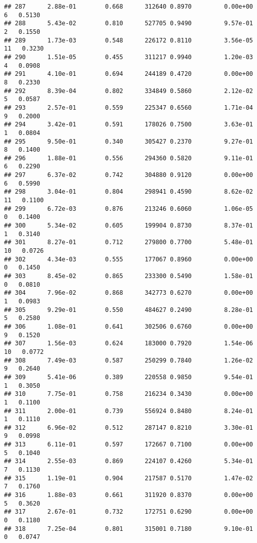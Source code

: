 \documentclass[
]{article}
\begin{document}
\begin{verbatim}
## 287      2.88e-01        0.668      312640 0.8970         0.00e+00   6   0.5130
## 288      5.43e-02        0.810      527705 0.9490         9.57e-01   2   0.1550
## 289      1.73e-03        0.548      226172 0.8110         3.56e-05  11   0.3230
## 290      1.51e-05        0.455      311217 0.9940         1.20e-03   4   0.0908
## 291      4.10e-01        0.694      244189 0.4720         0.00e+00   8   0.2330
## 292      8.39e-04        0.802      334849 0.5860         2.12e-02   5   0.0587
## 293      2.57e-01        0.559      225347 0.6560         1.71e-04   9   0.2000
## 294      3.42e-01        0.591      178026 0.7500         3.63e-01   1   0.0804
## 295      9.50e-01        0.340      305427 0.2370         9.27e-01   8   0.1400
## 296      1.88e-01        0.556      294360 0.5820         9.11e-01   6   0.2290
## 297      6.37e-02        0.742      304880 0.9120         0.00e+00   6   0.5990
## 298      3.04e-01        0.804      298941 0.4590         8.62e-02  11   0.1100
## 299      6.72e-03        0.876      213246 0.6060         1.06e-05   0   0.1400
## 300      5.34e-02        0.605      199904 0.8730         8.37e-01   1   0.3140
## 301      8.27e-01        0.712      279800 0.7700         5.48e-01  10   0.0726
## 302      4.34e-03        0.555      177067 0.8960         0.00e+00   0   0.1450
## 303      8.45e-02        0.865      233300 0.5490         1.58e-01   0   0.0810
## 304      7.96e-02        0.868      342773 0.6270         0.00e+00   1   0.0983
## 305      9.29e-01        0.550      484627 0.2490         8.28e-01   5   0.2580
## 306      1.08e-01        0.641      302506 0.6760         0.00e+00   9   0.1520
## 307      1.56e-03        0.624      183000 0.7920         1.54e-06  10   0.0772
## 308      7.49e-03        0.587      250299 0.7840         1.26e-02   9   0.2640
## 309      5.41e-06        0.389      220558 0.9850         9.54e-01   1   0.3050
## 310      7.75e-01        0.758      216234 0.3430         0.00e+00   1   0.1100
## 311      2.00e-01        0.739      556924 0.8480         8.24e-01   1   0.1110
## 312      6.96e-02        0.512      287147 0.8210         3.30e-01   9   0.0998
## 313      6.11e-01        0.597      172667 0.7100         0.00e+00   5   0.1040
## 314      2.55e-03        0.869      224107 0.4260         5.34e-01   7   0.1130
## 315      1.19e-01        0.904      217587 0.5170         1.47e-02   7   0.1760
## 316      1.88e-03        0.661      311920 0.8370         0.00e+00   5   0.3620
## 317      2.67e-01        0.732      172751 0.6290         0.00e+00   0   0.1180
## 318      7.25e-04        0.801      315001 0.7180         9.10e-01   0   0.0747

\end{verbatim}
\end{document}
